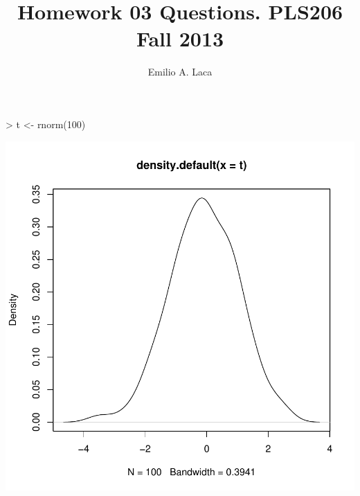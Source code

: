\documentclass[letterpaper]{tufte-book}
\title{Homework 03 Questions. PLS206 Fall 2013}
\author{Emilio A. Laca}
\begin{document}

\maketitle


\begin{Schunk}
\begin{Sinput}
> t <- rnorm(100)
\end{Sinput}
\end{Schunk}

\begin{marginfigure}
\includegraphics{QuestionsHW03-003}
\end{marginfigure}
\end{document}
